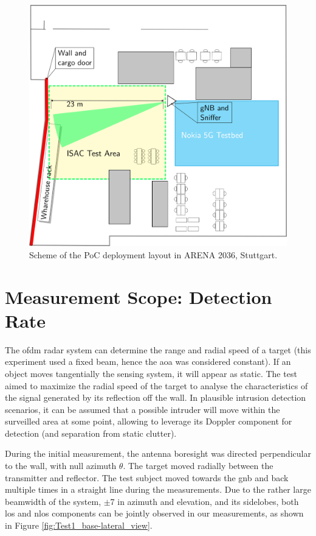 \begin{figure}[H]
	\centering
	\includegraphics[width=.6\textwidth]{Images/Test1/arena_plan}
	\caption{Scheme of the PoC deployment layout in ARENA 2036, Stuttgart.}
	\label{fig:Test1_arena_plan}
\end{figure}


\section{Measurement Scope: Detection Rate}

The \gls{ofdm} radar system can determine the range and radial speed of a target (this experiment used a fixed beam, hence the \gls{aoa} was considered constant). If an object moves tangentially \wrt the sensing system, it will appear as static.
The test aimed to maximize the radial speed of the target to analyse the characteristics of the signal generated by its reflection off the wall.
In plausible intrusion detection scenarios, it can be assumed that a possible intruder will move within the surveilled area at some point, allowing to leverage its Doppler component for detection (and separation from static clutter).

During the initial measurement, the antenna boresight was directed perpendicular to the wall, with null azimuth $\theta$.
The target moved radially between the transmitter and reflector. The test subject moved towards the \gls{gnb} and back multiple times in a straight line during the measurements.
Due to the rather large beamwidth of the system, $\pm$7\textdegree\hspace{1pt} in azimuth and elevation, and its sidelobes, both \gls{los} and \gls{nlos} components can be jointly observed in our measurements, as shown in Figure \ref{fig:Test1_base-lateral_view}.

